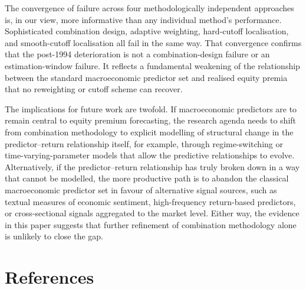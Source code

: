 \documentclass[a4paper,11pt]{article}
\begin{document}
The convergence of failure across four methodologically independent
approaches is, in our view, more informative than any individual
method's performance. Sophisticated combination design, adaptive
weighting, hard-cutoff localisation, and smooth-cutoff localisation all
fail in the same way. That convergence confirms that the post-1994
deterioration is not a combination-design failure or an
estimation-window failure. It reflects a fundamental weakening of the
relationship between the standard macroeconomic predictor set and
realised equity premia that no reweighting or cutoff scheme can recover.

The implications for future work are twofold. If macroeconomic
predictors are to remain central to equity premium forecasting, the
research agenda needs to shift from combination methodology to
explicit modelling of structural change in the predictor--return
relationship itself, for example, through regime-switching or
time-varying-parameter models that allow the predictive relationships
to evolve. Alternatively, if the predictor--return relationship has
truly broken down in a way that cannot be modelled, the more productive
path is to abandon the classical macroeconomic predictor set in favour
of alternative signal sources, such as textual measures of economic
sentiment, high-frequency return-based predictors, or cross-sectional
signals aggregated to the market level. Either way, the evidence in
this paper suggests that further refinement of combination methodology
alone is unlikely to close the gap.

\newpage
\section*{References}
\begingroup


\newpage

\newpage
\end{document}
